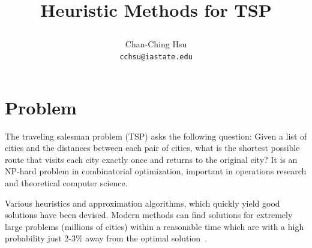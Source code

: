 \documentclass[11pt]{article}
\begin{document}
\title{
\begin{center}
\textbf{
\large Heuristic Methods for TSP
}
\end{center}}
\author{
Chan-Ching Hsu\\
\texttt{cchsu@iastate.edu}}
\date{\vspace{-5ex}}
\maketitle
\section{Problem}
The traveling salesman problem (TSP) asks the following question: Given a list of cities and the distances between each pair of cities, what is the shortest possible route that visits each city exactly once and returns to the original city? It is an NP-hard problem in combinatorial optimization, important in operations research and theoretical computer science.

Various heuristics and approximation algorithms, which quickly yield good solutions have been devised. Modern methods can find solutions for extremely large problems (millions of cities) within a reasonable time which are with a high probability just 2-3\% away from the optimal solution~\cite{TSP}.



\end{document}
